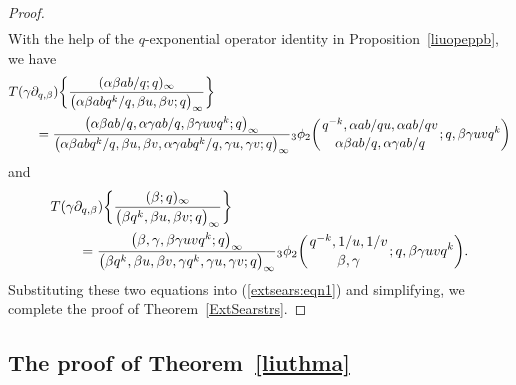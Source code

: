 \documentclass[pdftex]{sigma}
\numberwithin{equation}{section}
\begin{document}
\begin{proof}
\begin{align}
\label{extsears:eqn1}
\end{align}
With the help of the $q$-exponential operator identity in Proposition~\ref{liuopeppb}, we have
\begin{align*}
& T(\gamma \partial_{q, \beta}) \biggl\{ \frac{(\alpha \beta ab/q; q)_\infty}{\bigl(\alpha \beta ab q^k/q, \beta u, \beta v; q\bigr)_\infty} \biggr\}\\
&\qquad{}=\frac{\bigl(\alpha \beta ab/q, \alpha \gamma ab/q, \beta \gamma uvq^k; q\bigr)_\infty}
{\bigl(\alpha \beta ab q^k/q, \beta u, \beta v, \alpha \gamma ab q^k/q, \gamma u, \gamma v; q\bigr)_\infty}
 {_3\phi_2} \biggl({{q^{-k}, \alpha ab/qu, \alpha ab/qv}
\atop{\alpha \beta ab/q, \alpha \gamma ab/q }}; q, \beta \gamma uv q^k \biggr)
\end{align*}
and
\begin{align*}
& T(\gamma \partial_{q, \beta}) \biggl\{ \frac{(\beta; q)_\infty}{\bigl(\beta q^k, \beta u, \beta v; q\bigr)_\infty}
 \biggr\}\\
&\qquad{}=\frac{\bigl(\beta, \gamma, \beta \gamma uvq^k; q\bigr)_\infty}
{\bigl(\beta q^k, \beta u, \beta v, \gamma q^k, \gamma u, \gamma v; q\bigr)_\infty}
{_3\phi_2 \biggl({{q^{-k}, 1/u, 1/v}\atop{\beta, \gamma}}; q, \beta \gamma uv q^k\biggr)}.
\end{align*}
Substituting these two equations into (\ref{extsears:eqn1}) and simplifying, we complete
the proof of Theorem~\ref{ExtSearstrs}.
\end{proof}

\subsection{The proof of Theorem~\ref{liuthma}}
\end{document}
